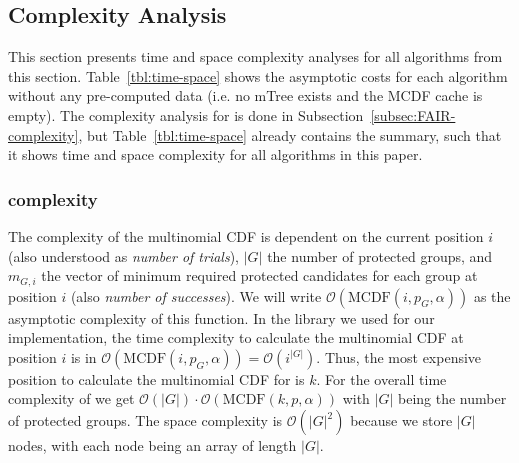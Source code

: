 \subsection{Complexity Analysis}
\begin{table}[b!]
	\caption{Time complexity for all algorithms without pre-computed results.\label{tbl:time-space}}
\end{table}

This section presents time and space complexity analyses for all algorithms from this section.
%
Table~\ref{tbl:time-space} shows the asymptotic costs for each algorithm without any pre-computed data (i.e. no mTree exists and the MCDF cache is empty).
%
The complexity analysis for \algoFAIR is done in Subsection~\ref{subsec:FAIR-complexity}, but Table~\ref{tbl:time-space} already contains the summary, such that it shows time and space complexity for all algorithms in this paper.

\subsubsection{\algoImcdf complexity}\label{subsubsec:imcdf-complexity}
The complexity of the multinomial CDF is dependent on the current position $i$ (also understood as \textit{number of trials}), $|G|$ the number of protected groups, and $m_{G,i}$ the vector of minimum required protected candidates for each group at position $i$ (also \textit{number of successes}).
%
We will write $\mathcal{O}(\text{MCDF}(i,p_G,\alpha))$ as the asymptotic complexity of this function.
%
In the library we used for our implementation, the time complexity to calculate the multinomial CDF at position $i$ is in $\mathcal{O}(\text{MCDF}(i,p_G,\alpha)) = \mathcal{O}(i^{|G|})$.
%
Thus, the most expensive position to calculate the multinomial CDF for is $k$.
%
For the overall time complexity of \algoImcdf we get $\mathcal{O}(|G|) \cdot \mathcal{O}(\text{MCDF}(k,p,\alpha ))$ with $|G|$ being the number of protected groups.
%
The space complexity is $\mathcal{O}(|G|^2)$ because we store $|G|$ nodes, with each node being an array of length $|G|$.
%
